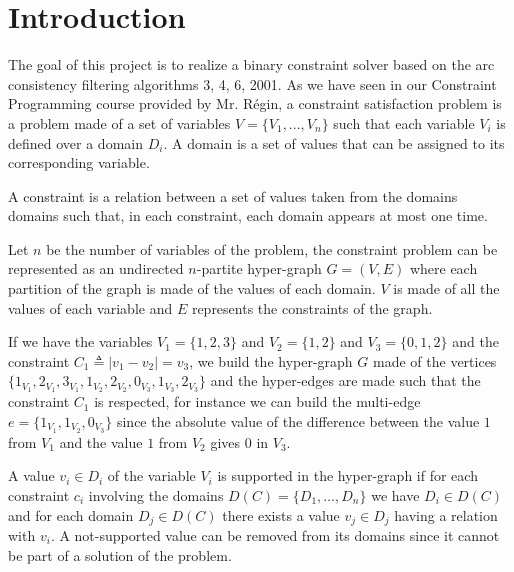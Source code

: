 \documentclass{rapport}
\begin{document}
\maketitle

\section{Introduction}

The goal of this project is to realize a binary constraint solver based on the arc consistency filtering algorithms \ac{3}, \ac{4}, \ac{6}, \ac{2001}. As we have seen in our Constraint Programming course provided by Mr. Régin, a constraint satisfaction problem is a problem made of a set of variables $V = \{V_1, ..., V_n\}$ such that each variable $V_i$ is defined over a domain $D_i$. A domain is a set of values that can be assigned to its corresponding variable.

A constraint is a relation between a set of values taken from the domains domains such that, in each constraint, each domain appears at most one time.

Let $n$ be the number of variables of the problem, the constraint problem can be represented as an undirected $n$-partite hyper-graph $G = (V, E)$ where each partition of the graph is made of the values of each domain. $V$ is made of all the values of each variable and $E$ represents the constraints of the graph.

\begin{example}
  \label{ex:p1}
  If we have the variables $V_1 = \{1, 2, 3\}$ and $V_2 = \{1, 2\}$ and $V_3 = \{0, 1, 2\}$ and the constraint $C_1 \triangleq |v_1 - v_2| = v_3$, we build the hyper-graph $G$ made of the vertices $\{1_{V_1}, 2_{V_1}, 3_{V_1}, 1_{V_2}, 2_{V_2}, 0_{V_3}, 1_{V_3}, 2_{V_3}\}$ and the hyper-edges are made such that the constraint $C_1$ is respected, for instance we can build the multi-edge $e = \{1_{V_1}, 1_{V_2}, 0_{V_3}\}$ since the absolute value of the difference between the value $1$ from $V_1$ and the value $1$ from $V_2$ gives $0$ in $V_3$.
\end{example}

A value $v_i \in D_i$ of the variable $V_i$ is supported in the hyper-graph if for each constraint $c_i$ involving the domains $D(C) = \{D_1, \dots, D_n\}$ we have $D_i \in D(C)$ and for each domain $D_j \in D(C)$ there exists a value $v_j \in D_j$ having a relation with $v_i$. A not-supported value can be removed from its domains since it cannot be part of a solution of the problem.
\end{document}

